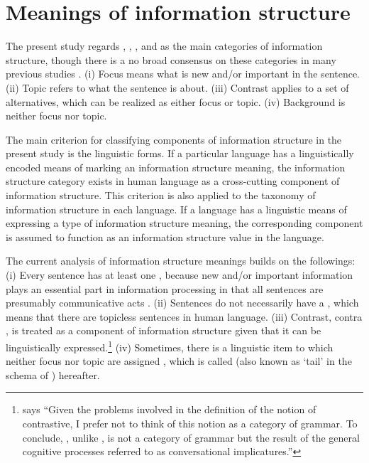 \chapter{Meanings of information structure}
\label{chapter3}
\setcounter{enums}{0}


The present study regards , , , and 
as the main categories of information structure, though there is a no
broad consensus on these categories in many previous studies
\citep{lambrecht:96,gundel:99,fery:krifka:08}. (i) Focus
means what is new and/or important in the sentence. (ii) Topic refers
to what the sentence is about. (iii) Contrast applies to a set of
alternatives, which can be realized as either
focus or topic.  (iv) Background is neither focus nor topic.


The main criterion for classifying components of information structure
in the present study is the linguistic forms.  If a particular
language has a linguistically encoded means of marking an information
structure meaning, the information structure category exists in human
language as a cross-cutting component of information structure.  This
criterion is also applied to the taxonomy of information structure in
each language. If a language has a linguistic means of expressing a
type of information structure meaning, the corresponding component is
assumed to function as an information structure value in the language.


The current analysis of information structure meanings builds on the
followings: (i) Every sentence has at least one , because new
and/or important information plays an essential part in information
processing in that all sentences are presumably communicative acts
\citep{engdahl:vallduvi:96,gundel:99}.  (ii) Sentences do not
necessarily have a  \citep{buring:99}, which means that there are
topicless sentences in human language.  (iii) Contrast, contra
\citet{lambrecht:96}, is treated as a component of information
structure given that it can be linguistically
expressed.\footnote{\citet[290--291]{lambrecht:96} says ``Given
  the problems involved in the definition of the notion of
  contrastive, I prefer not to think of this notion as a category of
  grammar. To conclude, , unlike , is not a
  category of grammar but the result of the general cognitive
  processes referred to as conversational implicatures.''} (iv)
Sometimes, there is a linguistic item to which neither focus nor topic
are assigned \citep{buring:99}, which is called 
(also known as `tail' in the schema of \citeauthor{vallduvi:vilkuna:98})
hereafter.


